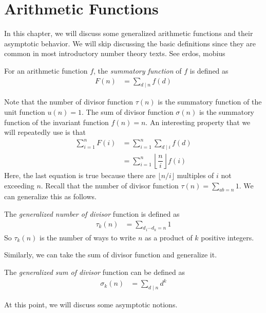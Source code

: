 \documentclass[elemannt.tex]{subfile}
\begin{document}
	\chapter{Arithmetic Functions}
	In this chapter, we will discuss some generalized arithmetic functions and their asymptotic behavior. We will skip discussing the basic definitions since they are common in most introductory number theory texts. See \gls{erdos}, \gls{mobius}
		\begin{definition}
			For an arithmetic function $f$, the \textit{summatory function} of $f$ is defined as
				\begin{align*}
					F(n)
						& = \sum_{d\mid n}f(d)
				\end{align*}
		\end{definition}
	Note that the number of divisor function $\tau(n)$ is the summatory function of the unit function $u(n)=1$. The sum of divisor function $\sigma(n)$ is the summatory function of the invariant function $f(n)=n$. An interesting property that we will repeatedly use is that
		\begin{align*}
			\sum_{i=1}^{n}F(i)
				& = \sum_{i=1}^{n}\sum_{d\mid i}f(d)\\
				& = \sum_{i=1}^{n}\left\lfloor{\dfrac{n}{i}}\right\rfloor f(i)
		\end{align*}
	Here, the last equation is true because there are $\lfloor{n/i}\rfloor$ multiples of $i$ not exceeding $n$. Recall that the number of divisor function $\tau(n)=\sum_{ab=n}1$. We can generalize this as follows.
		\begin{definition}
			The \textit{generalized number of divisor} function is defined as
				\begin{align*}
					\tau_{k}(n)
						& = \sum_{d_{1}\cdots d_{k}=n}1
				\end{align*}
			So $\tau_{k}(n)$ is the number of ways to write $n$ as a product of $k$ positive integers. 
		\end{definition}
	Similarly, we can take the sum of divisor function and generalize it.
		\begin{definition}
			The \textit{generalized sum of divisor} function can be defined as
				\begin{align*}
					\sigma_{k}(n)
						& = \sum_{d\mid n}d^{k}
				\end{align*}
		\end{definition}
	At this point, we will discuss some asymptotic notions.
\end{document}
